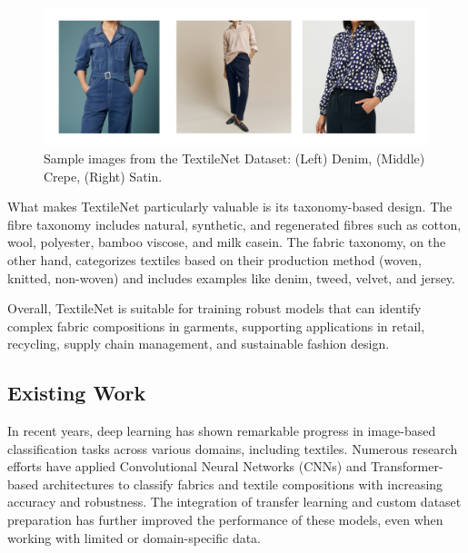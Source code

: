 \begin{figure}[H]
    \centering
    \begin{minipage}{0.8\linewidth}
        \includegraphics[width=\linewidth]{images/TextileNetDataset.png}
    \end{minipage}
    \caption[Sample images from the TextileNet Dataset]{Sample images from the TextileNet Dataset: (Left) Denim, (Middle) Crepe, (Right) Satin.}
\end{figure}

What makes TextileNet particularly valuable is its taxonomy-based design. The fibre taxonomy includes natural, synthetic, and regenerated fibres such as cotton, wool, polyester, bamboo viscose, and milk casein. The fabric taxonomy, on the other hand, categorizes textiles based on their production method (woven, knitted, non-woven) and includes examples like denim, tweed, velvet, and jersey.


Overall, TextileNet is suitable for training robust models that can identify complex fabric compositions in garments, supporting applications in retail, recycling, supply chain management, and sustainable fashion design.

\subsection{Existing Work}

In recent years, deep learning has shown remarkable progress in image-based classification tasks across various domains, including textiles. Numerous research efforts have applied Convolutional Neural Networks (CNNs) and Transformer-based architectures to classify fabrics and textile compositions with increasing accuracy and robustness. The integration of transfer learning and custom dataset preparation has further improved the performance of these models, even when working with limited or domain-specific data.

